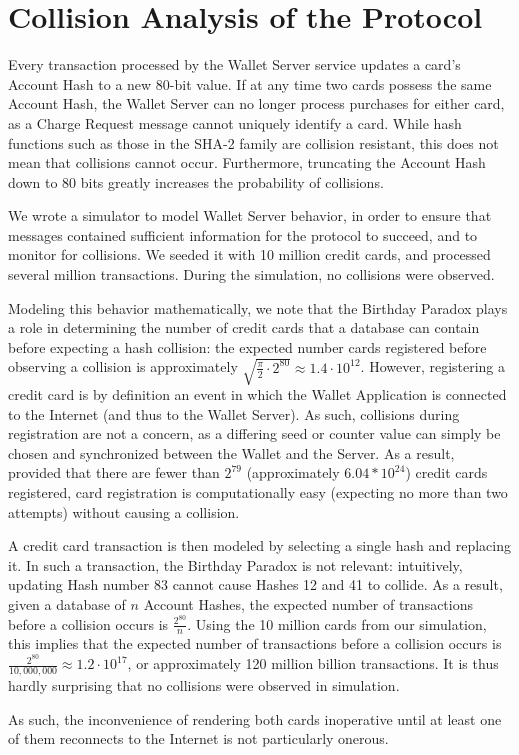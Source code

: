 \section{Collision Analysis of the Protocol}
\label{sec:collisions_and_simulations}

Every transaction processed by the Wallet Server service updates a card's Account Hash to a new 80-bit value.
If at any time two cards possess the same Account Hash, the Wallet Server can no longer process purchases for either card,
    as a Charge Request message cannot uniquely identify a card.
While hash functions such as those in the SHA-2 family are collision resistant, this does not mean that collisions cannot occur.
Furthermore, truncating the Account Hash down to 80 bits greatly increases the probability of collisions.

We wrote a simulator to model Wallet Server behavior, in order to ensure that messages contained sufficient information for the protocol to succeed,
    and to monitor for collisions.
We seeded it with 10 million credit cards, and processed several million transactions.
During the simulation, no collisions were observed.

Modeling this behavior mathematically, we note that the Birthday Paradox plays a role in determining the number of credit cards that a database can contain before expecting a hash collision:
the expected number cards registered before observing a collision is approximately
$\sqrt{\frac{\pi}{2} \cdot 2^{80}} \approx 1.4 \cdot 10^{12}$.
However, registering a credit card is by definition an event in which the Wallet Application is connected to the Internet (and thus to the Wallet Server).
As such, collisions during registration are not a concern, as a differing seed or counter value can simply be chosen and synchronized between the Wallet and the Server.
As a result, provided that there are fewer than $2^{79}$ (approximately $6.04 * 10^{24}$) credit cards registered, card registration is computationally easy (expecting no more than two attempts) without causing a collision.

A credit card transaction is then modeled by selecting a single hash and replacing it.
In such a transaction, the Birthday Paradox is not relevant:
intuitively, updating Hash number 83 cannot cause Hashes 12 and 41 to collide.
As a result, given a database of $n$ Account Hashes, the expected number of transactions before a collision occurs is
$\frac{2^{80}}{n}$.
Using the 10 million cards from our simulation, this implies that the expected number of transactions before a collision occurs is
$\frac{2^{80}}{10,000,000} \approx 1.2 \cdot 10 ^ {17}$, or approximately 120 million billion transactions.
It is thus hardly surprising that no collisions were observed in simulation.

As such, the inconvenience of rendering both cards inoperative until at least one of them reconnects to the Internet is not particularly onerous.